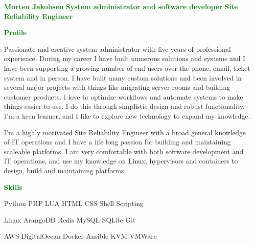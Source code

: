 \documentclass[11pt]{article}
\begin{document}
\raggedright

\textcolor{green}{{\fontsize{25}{30}\textbf{Morten Jakobsen}}}\newline
\if{}
    \textcolor{green}{{\fontsize{13}{16}\textbf{System administrator and software developer}}}\newline
\fi\if{}
    \textcolor{green}{{\fontsize{13}{16}\textbf{Site Reliability Engineer}}}\newline
\fi

\textcolor{green}{{\fontsize{13}{16}\textbf{{Profile}}}}\newline

\if{} %

Passionate and creative system administrator with five years of professional experience. During my career I have
built numerous solutions and systems and I have been supporting a growing number of end users over the phone,
email, ticket system and in person. I have built many custom solutions and been involved in several major
projects with things like migrating server rooms and building customer products. I love to optimize workflows
and automate systems to make things easier to use. I do this through simplistic design and robust functionality.
I’m a keen learner, and I like to explore new technology to expand my knowledge.\newline

\fi\if{} %

I'm a highly motivated Site Reliability Engineer with a broad general knowledge of IT operations and I have a
life long passion for building and maintaining scaleable platforms. I am very comfortable with both software
development and IT operations, and use my knowledge on Linux, hypervisors and containers to design, build and
maintaining platforms.\newline

\fi %

\textcolor{green}{{\fontsize{13}{0}\textbf{{Skills}}}}
\begin{multicols}{3}
Python\newline
PHP\newline
LUA\newline
HTML\newline
CSS\newline
Shell Scripting\newline

Linux\newline
ArangoDB\newline
Redis\newline
MySQL\newline
SQLite\newline
Git\newline

AWS\newline
DigitalOcean\newline
Docker\newline
Ansible\newline
KVM\newline
VMWare\newline
\end{multicols}
\end{document}
